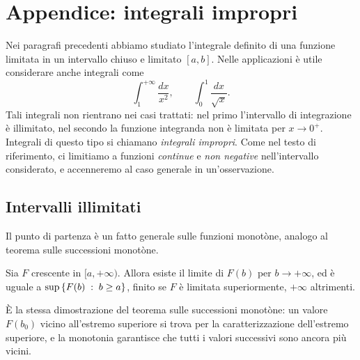 \section{Appendice: integrali impropri}
\label{sec:impropri}

Nei paragrafi precedenti abbiamo studiato l'integrale definito di una funzione limitata
in un intervallo chiuso e limitato $[a,b]$. Nelle applicazioni è utile considerare anche
integrali come
\begin{equation}\label{eq:impropri-esempi}
  \int_{1}^{+\infty}\frac{dx}{x^{2}}, \qquad \int_{0}^{1}\frac{dx}{\sqrt x} .
\end{equation}
Tali integrali non rientrano nei casi trattati: nel primo l'intervallo di integrazione
è illimitato, nel secondo la funzione integranda non è limitata per $x\to0^{+}$. Integrali
di questo tipo si chiamano \emph{integrali impropri}. Come nel
testo di riferimento, ci limitiamo a funzioni \emph{continue} e \emph{non negative}
nell'intervallo considerato, e accenneremo al caso generale in un'osservazione.

\subsection{Intervalli illimitati}

Il punto di partenza è un fatto generale sulle funzioni monotòne, analogo al teorema
sulle successioni monotòne.

\begin{lemma}\label{lem:monotona-infinito}
Sia $F$ crescente in $[a,+\infty)$. Allora esiste il limite di $F(b)$ per $b\to+\infty$, ed è
uguale a $\sup\left\{ F(b) \;:\; b\ge a \right\}$, finito se $F$ è limitata superiormente, $+\infty$ altrimenti.
\end{lemma}

\begin{schema}
\Ipotesi{$F$ crescente in $[a,+\infty)$.}
\end{schema}

\begin{strategia}
È la stessa dimostrazione del teorema sulle successioni monotòne: un valore $F(b_{0})$
vicino all'estremo superiore si trova per la caratterizzazione dell'estremo superiore, e
la monotonia garantisce che tutti i valori successivi sono ancora più vicini.
\end{strategia}

